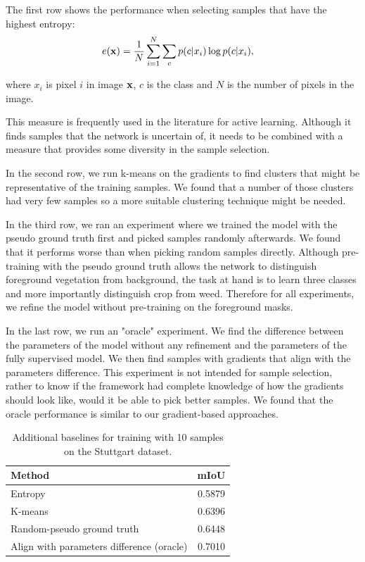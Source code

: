 \documentclass[letterpaper, 10 pt, conference]{ieeeconf}  %
\begin{document}
The first row shows the performance when selecting samples that have the highest entropy:
\begin{align}
e(\bold{x}) &= \frac{1}{N} \sum_{i=1}^N \sum_{c} p(c|x_i) \log p(c|x_i),
\end{align}  

where $x_i$ is pixel $i$ in image $\bold{x}$, $c$ is the class and $N$ is the number of pixels in the image.

This measure is frequently used in the literature \cite{chakraborty2015active, zhou2017fine} for active learning. Although it finds samples that the network is uncertain of, it needs to be combined with a measure that provides some diversity in the sample selection. 


In the second row, we run k-means on the gradients to find clusters that might be representative of the training samples. We found that a number of those clusters had very few samples so a more suitable clustering technique might be needed. 

In the third row, we ran an experiment where we trained the model with the pseudo ground truth first and picked samples randomly afterwards. We found that it performs worse than when picking random samples directly. Although pre-training with the pseudo ground truth allows the network to distinguish foreground vegetation from background, the task at hand is to learn three classes and more importantly distinguish crop from weed. Therefore for all experiments, we refine the model without pre-training on the foreground masks.

In the last row, we run an "oracle" experiment. We find the difference between the parameters of the model without any refinement and the parameters of the fully supervised model. We then find samples with gradients that align with the parameters difference. This experiment is not intended for sample selection, rather to know if the framework had complete knowledge of how the gradients should look like, would it be able to pick better samples. We found that the oracle performance is similar to our gradient-based approaches.



    
        \begin{table}
           \vspace{1em}
        \centering
        \caption{Additional baselines for training with 10 samples on the Stuttgart dataset.}
        \begin{tabular}{@{}lc@{}} 
            \toprule
            Method  & mIoU \\ 
            \midrule 
             Entropy   \cite{chakraborty2015active, zhou2017fine} & 0.5879   \\ \addlinespace
    		  K-means  & 0.6396  \\ \addlinespace
    		  Random-pseudo ground truth   & 0.6448  \\ \addlinespace
    		  Align with parameters difference (oracle)  & 0.7010  \\  
            \bottomrule
        \end{tabular}
        \label{tab:add_baselines}
    \end{table}
    
\end{document}
